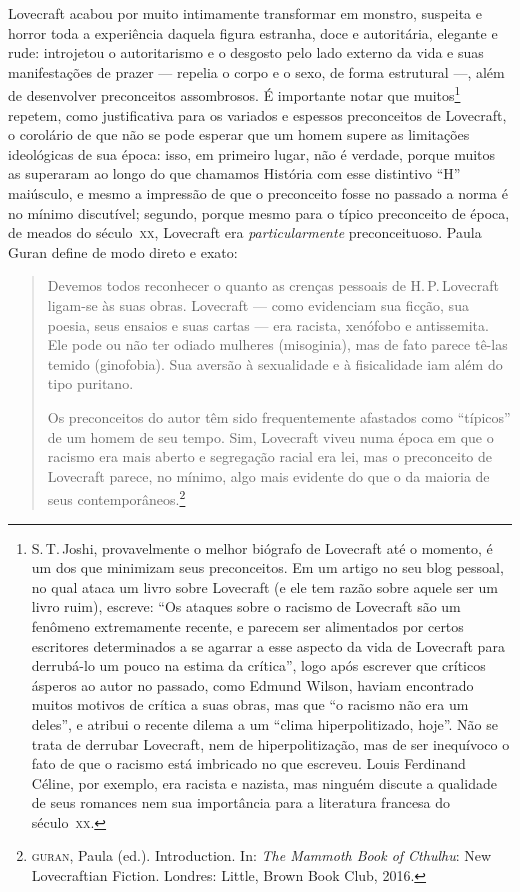 Lovecraft acabou por muito intimamente transformar em monstro, suspeita
e horror toda a experiência daquela figura estranha, doce e autoritária,
elegante e rude: introjetou o autoritarismo e o desgosto pelo lado
externo da vida e suas manifestações de prazer --- repelia o
corpo e o sexo, de forma estrutural ---, além de
desenvolver preconceitos assombrosos. É importante notar que
muitos\footnote{S.\,T.\,Joshi, provavelmente o melhor biógrafo de
  Lovecraft até o momento, é um dos que minimizam seus preconceitos. Em
  um artigo no seu blog pessoal, no qual ataca um livro sobre Lovecraft
  (e ele tem razão sobre aquele ser um livro ruim), escreve: ``Os ataques
  sobre o racismo de Lovecraft são um fenômeno extremamente recente, e
  parecem ser alimentados por certos escritores determinados a se
  agarrar a esse aspecto da vida de Lovecraft para derrubá-lo um pouco
  na estima da crítica'', logo após escrever que críticos ásperos ao
  autor no passado, como Edmund Wilson, haviam encontrado muitos motivos
  de crítica a suas obras, mas que ``o racismo não era um deles'', e
  atribui o recente dilema a um ``clima hiperpolitizado, hoje''. Não se
  trata de derrubar Lovecraft, nem de hiperpolitização, mas de ser
  inequívoco o fato de que o racismo está imbricado no que escreveu.
  Louis Ferdinand Céline, por exemplo, era racista e nazista, mas
  ninguém discute a qualidade de seus romances nem sua importância para
  a literatura francesa do século~\textsc{xx}.} repetem, como justificativa para
os variados e espessos preconceitos de Lovecraft, o corolário de que não
se pode esperar que um homem supere as limitações ideológicas de sua
época: isso, em primeiro lugar, não é verdade, porque muitos as
superaram ao longo do que chamamos História com esse distintivo ``H''
maiúsculo, e mesmo a impressão de que o preconceito fosse no passado a
norma é no mínimo discutível; segundo, porque mesmo para o típico
preconceito de época, de meados do século~\textsc{xx}, Lovecraft era
\emph{particularmente} preconceituoso. Paula Guran define de modo direto
e exato:

\begin{quote}
Devemos todos reconhecer o quanto as crenças pessoais de H.\,P.\,Lovecraft
ligam-se às suas obras. Lovecraft --- como evidenciam sua ficção,
sua poesia, seus ensaios e suas cartas --- era racista, xenófobo e
antissemita. Ele pode ou não ter odiado mulheres (misoginia), mas de
fato parece tê-las temido (ginofobia). Sua aversão à sexualidade e à
fisicalidade iam além do tipo puritano.

Os preconceitos do autor têm sido frequentemente afastados como
``típicos'' de um homem de seu tempo. Sim, Lovecraft viveu numa época em
que o racismo era mais aberto e segregação racial era lei, mas o
preconceito de Lovecraft parece, no mínimo, algo mais evidente do que o
da maioria de seus contemporâneos.\footnote{\textsc{guran}, Paula (ed.). Introduction. In:
  \emph{The Mammoth Book of Cthulhu}: New Lovecraftian Fiction. Londres:
  Little, Brown Book Club, 2016.}
\end{quote}

